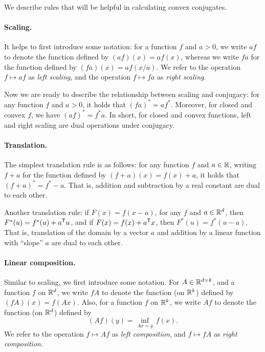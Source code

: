 We describe rules that will be helpful in calculating convex conjugates.  

\paragraph{Scaling.}

It helps to first introduce some notation: for a function $f$ and $a>0$, we 
write $af$ to denote the function defined by $(af)(x) = af(x)$, whereas we write
$fa$ for the function defined by $(fa)(x) = af(x/a)$. We refer to the operation
$f \mapsto af$ as \emph{left scaling}, and the operation $f \mapsto fa$ as
\emph{right scaling}.

Now we are ready to describe the relationship between scaling and conjugacy: for
any function $f$ and $a>0$, it holds that $(fa)^* = af^*$. Moreover, for closed 
and convex $f$, we have $(af)^* = f^*a$. In short, for closed and convex
functions, left and right scaling are dual operations under conjugacy. 

\paragraph{Translation.}

The simplest translation rule is as follows: for any function $f$ and $a \in
\mathbb{R}$, writing $f+a$ for the function defined by $(f+a)(x) = f(x)+a$, it holds
that $(f+a)^* = f^*-a$. That is, addition and subtraction by a real constant are
dual to each other.

Another translation rule: if $F(x) = f(x-a)$, for any $f$ and $a \in \mathbb{R}^d$, then
$F^*(u) = f^*(u) + a^{\mathsf{T}} u$, and if $F(x) = f(x) + a^{\mathsf{T}} x$, then $F^*(u) =
f^*(u-a)$. That is, translation of the domain by a vector $a$ and addition by a
linear function with ``slope'' $a$ are dual to each other. 

\paragraph{Linear composition.}

Similar to scaling, we first introduce some notation. For $A \in \mathbb{R}^{d \times
  k}$, and a function $f$ on $\mathbb{R}^d$, we write $fA$ to denote the function (on
$\mathbb{R}^k$) defined by $(fA)(x) = f(Ax)$. Also, for a function $f$ on $\mathbb{R}^k$, we
write $Af$ to denote the function (on $\mathbb{R}^d$) defined by 
\[
(Af)(y) = \inf_{Ax=y} \, f(x).
\]
We refer to the operation $f \mapsto Af$ as \emph{left composition}, and $f
\mapsto fA$ as \emph{right composition}.

